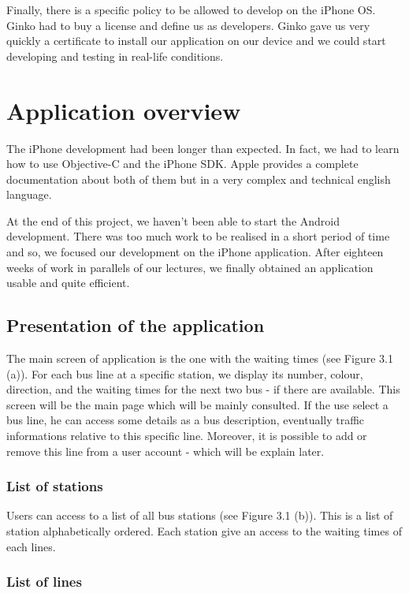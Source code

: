 \documentclass[a4paper, 12pt]{report}
\begin{document}
Finally, there is a specific policy to be allowed to develop on the iPhone OS. Ginko had to buy a license and define us as developers. Ginko gave us very quickly a certificate to install our application on our device and we could start developing and testing in real-life conditions.


\chapter{Application overview}



The iPhone development had been longer than expected. In fact, we had to learn how to use Objective-C and the iPhone SDK. Apple provides a complete documentation about both of them but in a very complex and technical english language.

At the end of this project, we haven't been able to start the Android development. There was too much work to be realised in a short period of time and so, we focused our development on the iPhone application. After eighteen weeks of work in parallels of our lectures, we finally obtained an application usable and quite efficient.


\section{Presentation of the application}

The main screen of application is the one with the waiting times (see Figure 3.1 (a)). For each bus line at a specific station, we display its number, colour, direction, and the waiting times for the next two bus - if there are available. This screen will be the main page which will be mainly consulted. If the use select a bus line, he can access some details as a bus description, eventually traffic informations relative to this specific line. Moreover, it is possible to add or remove this line from a user account - which will be explain later.


\subsection{List of stations}


Users can access to a list of all bus stations (see Figure 3.1 (b)). This is a list of station alphabetically ordered. Each station give an access to the waiting times of each lines.

\subsection{List of lines}
\end{document}
